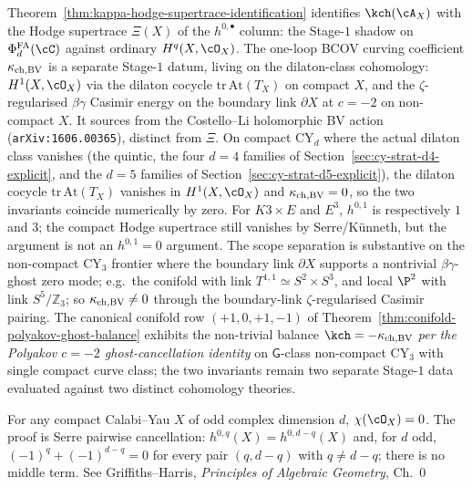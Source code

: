 \begin{remark}
\label{rem:kappa-ch-vs-kappa-chBV-scope}
Theorem~\ref{thm:kappa-hodge-supertrace-identification} identifies
$\kch(\cA_X)$ with the Hodge supertrace $\Xi(X)$ of the
$h^{0, \bullet}$ column: the Stage-$1$ shadow on $\PhiFA_d(\cC)$
against ordinary $H^q(X, \cO_X)$. The one-loop BCOV curving coefficient
$\kappa_{\mathrm{ch,BV}}$ is a separate Stage-$1$ datum, living on the dilaton-class
cohomology: $H^1(X, \cO_X)$ via the dilaton cocycle
$\mathrm{tr}\, \mathrm{At}(T_X)$ on compact $X$, and the
$\zeta$-regularised $\beta\gamma$ Casimir energy on the boundary link
$\partial X$ at $c = -2$ on non-compact $X$. It sources from the
Costello--Li holomorphic BV action (\texttt{arXiv:1606.00365}),
distinct from $\Xi$. On compact
CY$_d$ where the actual dilaton class vanishes (the quintic, the four
$d = 4$ families of Section~\ref{sec:cy-strat-d4-explicit}, and the
$d = 5$ families of Section~\ref{sec:cy-strat-d5-explicit}), the
dilaton cocycle
$\mathrm{tr}\, \mathrm{At}(T_X)$ vanishes in $H^1(X, \cO_X)$ and
$\kappa_{\mathrm{ch,BV}} = 0$, so the two invariants coincide numerically by zero.
For $K3\times E$ and $E^3$, $h^{0,1}$ is respectively $1$ and $3$;
the compact Hodge supertrace still vanishes by Serre/Künneth, but the
argument is not an $h^{0,1}=0$ argument.
The scope separation is substantive on the non-compact CY$_3$
frontier where the boundary link $\partial X$ supports a nontrivial
$\beta\gamma$-ghost zero mode; e.g.\ the conifold with link
$T^{1,1} \simeq S^2 \times S^3$, and local $\P^2$ with link
$S^5/\mathbb Z_3$; so $\kappa_{\mathrm{ch,BV}} \neq 0$ through the boundary-link
$\zeta$-regularised Casimir pairing. The canonical conifold row
$(+1, 0, +1, -1)$ of
Theorem~\ref{thm:conifold-polyakov-ghost-balance} exhibits the
non-trivial balance $\kch = -\kchBV$ \emph{per the Polyakov
$c = -2$ ghost-cancellation identity} on $\mathsf G$-class
non-compact CY$_3$ with single compact curve class; the two
invariants remain two separate Stage-$1$ data evaluated against two
distinct cohomology theories.
\end{remark}

\begin{lemma}
\label{lem:chi-O-vanishes-odd-d}
For any compact Calabi--Yau $X$ of odd complex dimension $d$,
$\chi(\cO_X) = 0$. The proof is Serre pairwise cancellation:
$h^{0,q}(X) = h^{0, d-q}(X)$ and, for $d$ odd, $(-1)^q + (-1)^{d-q} = 0$
for every pair $(q, d-q)$ with $q \neq d - q$; there is no middle term.
See Griffiths--Harris, \emph{Principles of Algebraic Geometry}, Ch.~0
\end{lemma}

